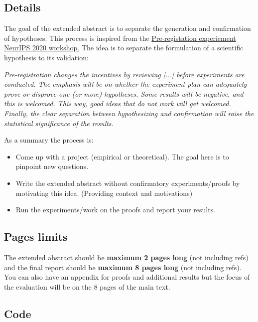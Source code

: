 \documentclass{article}
\begin{document}
\subsection{Details}
The goal of the extended abstract is to separate the generation and confirmation of hypotheses. This process is inspired from the \href{https://preregister.science/}{Pre-registation experiement NeurIPS 2020 workshop.} The idea is to separate the formulation of a scientific hypothesis to its validation: 
\begin{center}
\begin{minipage}{ .9\textwidth}
\emph{Pre-registration changes the incentives by reviewing [...] before experiments are conducted. The emphasis will be on whether the experiment plan can adequately prove or disprove one (or more) hypotheses. Some results will be negative, and this is welcomed. This way, good ideas that do not work will get welcomed. Finally, the clear separation between hypothesizing and confirmation will raise the statistical significance of the results.}
\end{minipage}
\end{center}
As a summary the process is:
\begin{itemize}
    \item Come up with a project (empirical or theoretical). The goal here is to pinpoint new questions.
    \item Write the extended abstract without confirmatory experiments/proofs by motivating this idea. (Providing context and motivations) 
    \item Run the experiments/work on the proofs and report your results.
\end{itemize}

    
\subsection{Pages limits}

The extended abstract should be \textbf{maximum 2 pages long} (not including refs) and the final report should be \textbf{maximum 8 pages long} (not including refs). You can also have an appendix for proofs and additional results but the focus of the evaluation will be on the 8 pages of the main text.

\subsection{Code}
\end{document}
